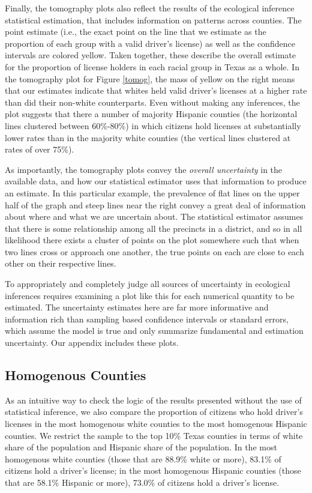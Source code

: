 \documentclass[12pt]{article}
\begin{document}
Finally, the tomography plots also reflect the results of the
ecological inference statistical estimation, that includes information
on patterns across counties. The point estimate (i.e., the exact
point on the line that we estimate as the proportion of each group with a valid driver's license)
as well as the confidence intervals are colored yellow.  Taken
together, these describe the overall estimate for the proportion of license holders in
each racial group in Texas as a whole. In the tomography plot
for Figure \ref{tomog}, the mass of yellow on the right means that our
estimates indicate that whites held valid driver's licenses at a higher rate than did their
non-white counterparts. Even without making any inferences, the plot suggests that there
a number of majority Hispanic counties (the horizontal lines clustered between 60\%-80\%) 
in which citizens hold licenses at substantially lower
rates than in the majority white counties (the vertical lines clustered at rates of over 75\%). 

As importantly, the tomography plots convey the \emph{overall
  uncertainty} in the available data, and how our statistical
estimator uses that information to produce an estimate.  In this
particular example, the prevalence of flat lines on the upper half of the graph and
steep lines near the right convey a great deal of information about
where and what we are uncertain about.  The statistical estimator
assumes that there is some relationship among all the precincts in a
district, and so in all likelihood there exists a cluster of points on
the plot somewhere such that when two lines cross or approach one
another, the true points on each are close to each other on their
respective lines.  

To appropriately and completely judge all sources of uncertainty in
ecological inferences requires examining a plot like this for each
numerical quantity to be estimated.  The uncertainty estimates here
are far more informative and information rich than sampling based
confidence intervals or standard errors, which assume the model is
true and only summarize fundamental and estimation uncertainty.  Our
appendix includes these plots.

\subsection{Homogenous Counties}

As an intuitive way to check the logic of the results presented without the use of statistical inference, we also compare the proportion of citizens who hold driver's licenses in the most homogenous white counties to the most homogenous Hispanic counties. We restrict the sample to the top 10\% Texas counties in terms of white share of the population and Hispanic share of the population. In the most homogenous white counties (those that are 88.9\% white or more), 83.1\% of citizens hold a driver's license; in the most homogenous Hispanic counties (those that are 58.1\% Hispanic or more), 73.0\% of citizens hold a driver's license.
\end{document}
